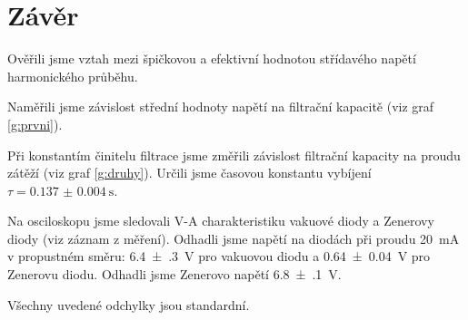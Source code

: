 \section*{Závěr}
Ověřili jsme vztah mezi špičkovou a efektivní hodnotou střídavého napětí harmonického průběhu.

Naměřili jsme závislost střední hodnoty napětí na filtrační kapacitě (viz graf \ref{g:prvni}).

Při konstantím činitelu filtrace jsme změřili závislost filtrační kapacity na proudu zátěží (viz graf \ref{g:druhy}).
Určili jsme časovou konstantu vybíjení $\tau = \SI{0.137(4)}{\second}$.

Na osciloskopu jsme sledovali V-A charakteristiku vakuové diody a Zenerovy diody (viz záznam z měření).
Odhadli jsme napětí na diodách při proudu \SI{20}{\milli\ampere} v propustném směru: \SI{6.4(3)}{\volt} pro vakuovou diodu a \SI{0.64(4)}{\volt} pro Zenerovu diodu.
Odhadli jsme Zenerovo napětí \SI{6.8(1)}{\volt}.

Všechny uvedené odchylky jsou standardní.